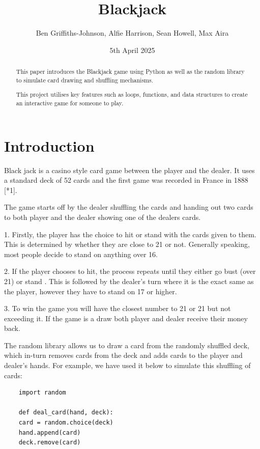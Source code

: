 \documentclass{article}
\title{Blackjack}
\author{Ben Griffiths-Johnson, Alfie Harrison, Sean Howell, Max Aira }
\date{5th April 2025}
\begin{document}
\maketitle

\begin{abstract}
    This paper introduces the Blackjack game using Python as well as the random library to simulate card drawing and shuffling mechanisms. 
    
    This project utilises key features such as loops, functions, and data structures to create an interactive game for someone to play.
\end{abstract}

\section{Introduction}
Black jack is a casino style card game between the player and the dealer. It uses a standard deck of 52 cards and the first game was recorded in France in 1888 [*1]. 


The game starts off by the dealer shuffling the cards and handing out two cards to both player and the dealer showing one of the dealers cards.


1. Firstly, the player has the choice to hit or stand with the cards given to them. This is determined by whether they are close to 21 or not. Generally speaking, most people decide to stand on anything over 16.


2. If the player chooses to hit, the process repeats until they either go bust (over 21) or stand . This is followed by the dealer's turn where it is the exact same as the player, however they have to stand on 17 or higher.


3. To win the game you will have the closest number to 21 or 21 but not exceeding it. If the game is a draw both player and dealer receive their money back.

The random library allows us to draw a card from the randomly shuffled deck, which in-turn removes cards from the deck and adds cards to the player and dealer's hands. 
For example, we have used it below to simulate this shuffling of cards:

\begin{lstlisting}
    import random
    
    def deal_card(hand, deck):
    card = random.choice(deck)
    hand.append(card)
    deck.remove(card)
    
\end{lstlisting}
\end{document}
